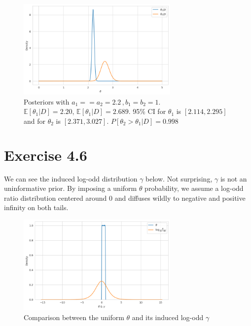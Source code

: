 \documentclass[11pt, letterpaper]{article}
\begin{document}
\begin{figure}[!h]
  \centering
  \includegraphics[width=0.7\textwidth]{4.5.c.3.png}
  \captionsetup{justification=centering}
  \caption{
    Posteriors with $a_1==a_2=2.2\,, b_1=b_2=1$. \\
    $\mathbb{E}[\theta_1|D]=2.20$, $\mathbb{E}[\theta_1|D]=2.689$.
    95\% CI for $\theta_1$ is $[2.114, 2.295]$ and for $\theta_2$ is $[2.371, 3.027]$.
    $P[\theta_2 > \theta_1|D]=0.998$
  }
\end{figure}


\section{Exercise 4.6}
We can see the induced log-odd distribution $\gamma$ below. Not surprising, $\gamma$ is not an uninformative prior. By imposing a uniform $\theta$ probability, we assume a log-odd ratio distribution centered around 0 and diffuses wildly to negative and positive infinity on both tails.

\begin{figure}[!h]
  \centering
  \includegraphics[width=0.7\textwidth]{4.6.png}
  \captionsetup{justification=centering}
  \caption{Comparison between the uniform $\theta$ and its induced log-odd $\gamma$}
\end{figure}
\end{document}
